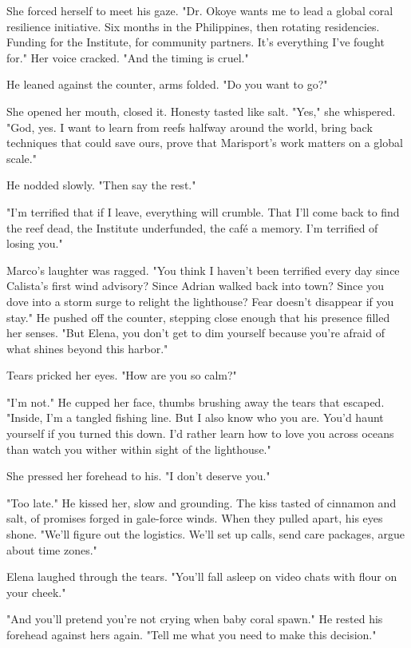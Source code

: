 She forced herself to meet his gaze. "Dr. Okoye wants me to lead a global coral resilience initiative. Six months in the Philippines, then rotating residencies. Funding for the Institute, for community partners. It's everything I've fought for." Her voice cracked. "And the timing is cruel."

He leaned against the counter, arms folded. "Do you want to go?"

She opened her mouth, closed it. Honesty tasted like salt. "Yes," she whispered. "God, yes. I want to learn from reefs halfway around the world, bring back techniques that could save ours, prove that Marisport's work matters on a global scale."

He nodded slowly. "Then say the rest."

"I'm terrified that if I leave, everything will crumble. That I'll come back to find the reef dead, the Institute underfunded, the café a memory. I'm terrified of losing you."

Marco's laughter was ragged. "You think I haven't been terrified every day since Calista's first wind advisory? Since Adrian walked back into town? Since you dove into a storm surge to relight the lighthouse? Fear doesn't disappear if you stay." He pushed off the counter, stepping close enough that his presence filled her senses. "But Elena, you don't get to dim yourself because you're afraid of what shines beyond this harbor."

Tears pricked her eyes. "How are you so calm?"

"I'm not." He cupped her face, thumbs brushing away the tears that escaped. "Inside, I'm a tangled fishing line. But I also know who you are. You'd haunt yourself if you turned this down. I'd rather learn how to love you across oceans than watch you wither within sight of the lighthouse."

She pressed her forehead to his. "I don't deserve you."

"Too late." He kissed her, slow and grounding. The kiss tasted of cinnamon and salt, of promises forged in gale-force winds. When they pulled apart, his eyes shone. "We'll figure out the logistics. We'll set up calls, send care packages, argue about time zones."

Elena laughed through the tears. "You'll fall asleep on video chats with flour on your cheek."

"And you'll pretend you're not crying when baby coral spawn." He rested his forehead against hers again. "Tell me what you need to make this decision."

